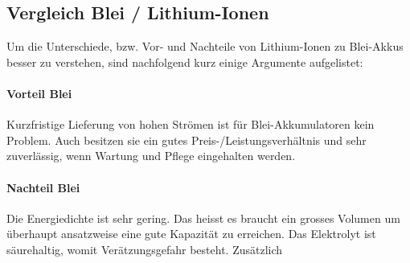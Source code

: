 \subsection{Vergleich Blei / Lithium-Ionen} \label{kap:Vergleich_liion_pb}

Um die Unterschiede, bzw. Vor- und Nachteile von Lithium-Ionen zu Blei-Akkus besser zu verstehen, sind nachfolgend kurz einige Argumente aufgelistet:

\paragraph{Vorteil Blei}

Kurzfristige Lieferung von hohen Strömen ist für Blei-Akkumulatoren kein Problem. Auch besitzen sie ein gutes Preis-/Leistungsverhältnis und sehr zuverlässig, wenn Wartung und Pflege eingehalten werden.

\paragraph{Nachteil Blei}

Die Energiedichte ist sehr gering. Das heisst es braucht ein grosses Volumen um überhaupt ansatzweise eine gute Kapazität zu erreichen. Das Elektrolyt ist säurehaltig, womit Verätzungsgefahr besteht. Zusätzlich